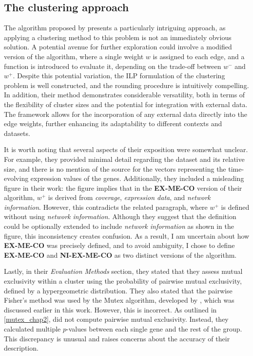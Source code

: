 \subsection{The clustering approach}

The algorithm proposed by \textcite{c3} presents a particularly intriguing approach, as applying a clustering method to this problem is not an immediately obvious solution. A potential avenue for further exploration could involve a modified version of the algorithm, where a single weight $w$ is assigned to each edge, and a function is introduced to evaluate it, depending on the trade-off between $w^-$ and $w^+$. Despite this potential variation, the ILP formulation of the clustering problem is well constructed, and the rounding procedure is intuitively compelling. In addition, their method demonstrates considerable versatility, both in terms of the flexibility of cluster sizes and the potential for integration with external data. The framework allows for the incorporation of any external data directly into the edge weights, further enhancing its adaptability to different contexts and datasets.

It is worth noting that several aspects of their exposition were somewhat unclear. For example, they provided minimal detail regarding the dataset and its relative size, and there is no mention of the source for the vectors representing the time-evolving expression values of the genes. Additionally, they included a misleading figure in their work: the figure implies that in the \textbf{EX-ME-CO} version of their algorithm, $w^+$ is derived from \textit{coverage}, \textit{expression data}, and \textit{network information}. However, this contradicts the related paragraph, where $w^+$ is defined without using \textit{network information}. Although they suggest that the definition could be optionally extended to include \textit{network information} as shown in the figure, this inconsistency creates confusion. As a result, I am uncertain about how \textbf{EX-ME-CO} was precisely defined, and to avoid ambiguity, I chose to define \textbf{EX-ME-CO} and \textbf{NI-EX-ME-CO} as two distinct versions of the algorithm.

Lastly, in their \textit{Evaluation Methods} section, they stated that they assess mutual exclusivity within a cluster using the probability of pairwise mutual exclusivity, defined by a hypergeometric distribution. They also stated that the pairwise Fisher’s method was used by the Mutex algorithm, developed by \textcite{mutex}, which was discussed earlier in this work. However, this is incorrect. As outlined in \cref{mutex_chap2}, \textcite{mutex} did not compute pairwise mutual exclusivity. Instead, they calculated multiple $p$-values between each single gene and the rest of the group. This discrepancy is unusual and raises concerns about the accuracy of their description.

\cleardoublepage
